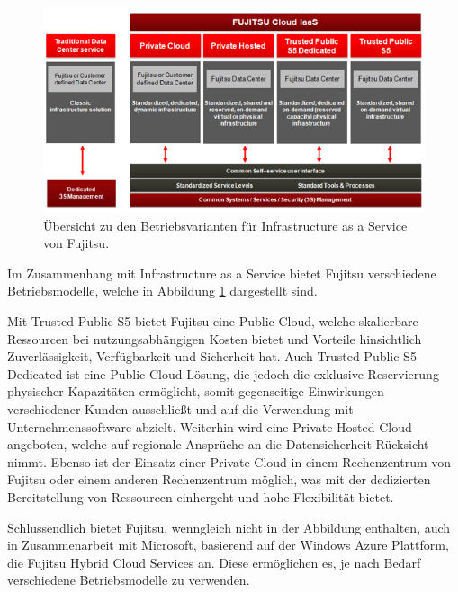 \begin{figure}
	\centering
	\includegraphics[width=0.8\linewidth]{images/fujitsuModels}
	\caption{Übersicht zu den Betriebsvarianten für Infrastructure as a Service von Fujitsu. \cite{fujitsuIaaS}}
	\label{fig:fujitsuModels}
\end{figure}

Im Zusammenhang mit Infrastructure as a Service bietet Fujitsu verschiedene Betriebsmodelle\cite{fujitsuIaaS}, welche in Abbildung \ref{fig:fujitsuModels} dargestellt sind. 

Mit Trusted Public S5 bietet Fujitsu eine Public Cloud, welche skalierbare Ressourcen bei nutzungsabhängigen Kosten bietet und Vorteile hinsichtlich Zuverlässigkeit, Verfügbarkeit und Sicherheit hat. 
Auch Trusted Public S5 Dedicated ist eine Public Cloud Lösung, die jedoch die exklusive Reservierung physischer Kapazitäten ermöglicht, somit gegenseitige Einwirkungen verschiedener Kunden ausschließt und auf die Verwendung mit Unternehmenssoftware abzielt. 
Weiterhin wird eine Private Hosted Cloud angeboten, welche auf regionale Ansprüche an die Datensicherheit Rücksicht nimmt. 
Ebenso ist der Einsatz einer Private Cloud in einem Rechenzentrum von Fujitsu oder einem anderen Rechenzentrum möglich, was mit der dedizierten Bereitstellung von Ressourcen einhergeht und hohe Flexibilität bietet. 

Schlussendlich bietet Fujitsu, wenngleich nicht in der Abbildung enthalten, auch in Zusammenarbeit mit Microsoft, basierend auf der Windows Azure Plattform, die Fujitsu Hybrid Cloud Services\cite{fujitsuHybrid} an. Diese ermöglichen es, je nach Bedarf verschiedene Betriebsmodelle zu verwenden. 
